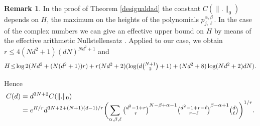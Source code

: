 \documentclass[11pt]{article}
\theoremstyle{plain}
\theoremstyle{definition}
\newtheorem{obs}[teo]{Remark}
\begin{document}
\begin{obs}\label{effective} In the proof of Theorem \ref{desigualdad} the constant $C(\|.\|_0)$ depends on $H$, the maximum on the heights of the polynomials $p_{j,\ell}^{\alpha,\beta}$. In the case of the complex numbers we can give an effective upper bound on $H$ by means of the effective arithmetic Nullstellensatz \cite[Th.\,1]{klpasom}. Applied to our case, we obtain $r\leq 4(Nd^2+1)(dN)^{Nd^2+1}$ and
\begin{equation*}
H\!\leq\!\log{2}(Nd^2+(N(d^2+1))r)+r(Nd^2+2)(\log(d\tbinom{N+1}{2}+1)+(Nd^2+8)\log(Nd^2+2)dN).
\end{equation*}
\end{obs}
Hence
\begin{equation*}
\begin{split}
C(d)& =d^{3N+2}C(\|.\|_0) \\[-5pt]
& =e^{H/r}d^{3N+2+(N+1)(d-1)/r}\biggl( \sum_{\alpha,\beta,\ell}{{\tbinom{d^2-1+r}{r}}^{{N-\beta+\alpha-1}}{\tbinom{d^2-1+r-\ell}{r-\ell}}^{{\beta-\alpha+1}}\tbinom{d}{\ell}}\biggr)^{1/r}.
\end{split}
\end{equation*}
\end{document}
